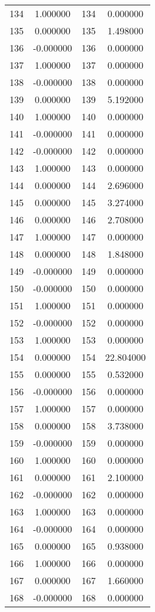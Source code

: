 \documentclass[12pt]{article}
\begin{document}
\begin{longtable}{@{}cccc@{}}
134 & 1.000000 & 134 & 0.000000 \\
135 & 0.000000 & 135 & 1.498000 \\
136 & -0.000000 & 136 & 0.000000 \\
137 & 1.000000 & 137 & 0.000000 \\
138 & -0.000000 & 138 & 0.000000 \\
139 & 0.000000 & 139 & 5.192000 \\
140 & 1.000000 & 140 & 0.000000 \\
141 & -0.000000 & 141 & 0.000000 \\
142 & -0.000000 & 142 & 0.000000 \\
143 & 1.000000 & 143 & 0.000000 \\
144 & 0.000000 & 144 & 2.696000 \\
145 & 0.000000 & 145 & 3.274000 \\
146 & 0.000000 & 146 & 2.708000 \\
147 & 1.000000 & 147 & 0.000000 \\
148 & 0.000000 & 148 & 1.848000 \\
149 & -0.000000 & 149 & 0.000000 \\
150 & -0.000000 & 150 & 0.000000 \\
151 & 1.000000 & 151 & 0.000000 \\
152 & -0.000000 & 152 & 0.000000 \\
153 & 1.000000 & 153 & 0.000000 \\
154 & 0.000000 & 154 & 22.804000 \\
155 & 0.000000 & 155 & 0.532000 \\
156 & -0.000000 & 156 & 0.000000 \\
157 & 1.000000 & 157 & 0.000000 \\
158 & 0.000000 & 158 & 3.738000 \\
159 & -0.000000 & 159 & 0.000000 \\
160 & 1.000000 & 160 & 0.000000 \\
161 & 0.000000 & 161 & 2.100000 \\
162 & -0.000000 & 162 & 0.000000 \\
163 & 1.000000 & 163 & 0.000000 \\
164 & -0.000000 & 164 & 0.000000 \\
165 & 0.000000 & 165 & 0.938000 \\
166 & 1.000000 & 166 & 0.000000 \\
167 & 0.000000 & 167 & 1.660000 \\
168 & -0.000000 & 168 & 0.000000 \\

\end{longtable}
\end{document}
